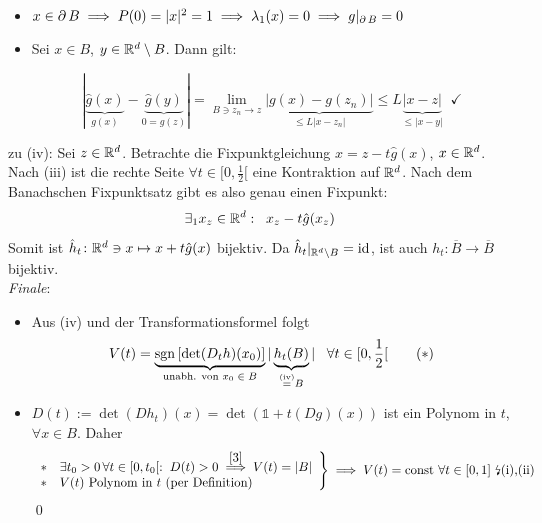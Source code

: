 \documentclass[a4paper]{article}
\begin{document}
\begin{Beweis}
\begin{itemize}
\begin{align*}
\end{align*}
\item $x\in \operatorname{\partial} B\implies P(0)=|x|^2=1\implies \lambda_1(x)=0\implies g|_{\operatorname{\partial} B}=0$
\item Sei $x\in B$, $y\in \mathbb R^d\setminus B$. Dann gilt:\\
\begin{minipage}{0.6\linewidth}
\[|\underbrace{\hat{g}(x)}_{g(x)}-\underbrace{\hat{g}(y)}_{0=g(z)}|=\lim_{B\ni z_n\to z}\underbrace{|g(x)-g(z_n)|}_{\le L|x-z_n|}\le L\underbrace{|x-z|}_{\le |x-y|}\;\;\checkmark\]
\end{minipage}
\begin{minipage}{0.39\linewidth}
\centering
{}
\end{minipage}
\end{itemize}
zu (iv): Sei $z\in\mathbb R^d$. Betrachte die Fixpunktgleichung $x=z-t\hat{g}(x)$, $x\in\mathbb R^d$. Nach (iii) ist die rechte Seite $\forall t\in [0,\frac{1}{2}[$ eine Kontraktion auf $\mathbb R^d$. Nach dem Banachschen Fixpunktsatz gibt es also genau einen Fixpunkt: 
\[\exists_1 x_z\in\mathbb R^d:\;\;x_z-t\hat{g}(x_z)\]
Somit ist $\hat{h}_t\colon \mathbb R^d\ni x\mapsto x+t\hat{g}(x)$ bijektiv. Da $\hat{h}_t|_{\mathbb R^d\setminus B}=\operatorname{\mathrm{id}}$, ist auch $h_t\colon \overline B\to\overline B$ bijektiv.\\
\textit{Finale}:
\begin{itemize}
\item Aus (iv) und der Transformationsformel folgt
\[V(t)=\underbrace{\operatorname{\mathrm{sgn}}\left[\det(D_th)(x_0)\right]}_{\text{unabh. von $x_0\in B$}}|\underbrace{h_t(B)}_{\overset{\text{(iv)}}{=}B}|\;\;\;\forall t\in [0,\frac{1}{2}[\tag{$*$}\label{3}\]
\item $D(t):=\det(Dh_t)(x)=\det(\mathds 1+t(Dg)(x))$ ist ein Polynom in $t$, $\forall x\in B$. Daher
\[ \left.\begin{array}{cl}
*&\exists t_0>0\,\forall t\in[0,t_0[:\;D(t)>0\overset{\eqref{3}}{\implies}V(t)=|B|\\
*& V(t)\text{ Polynom in }t\text{ (per Definition)}
\end{array} \right\}\implies V(t)=\text{const }\forall t\in[0,1]\text{ \lightning (i),(ii)}\]\qed
\end{itemize}
\end{Beweis}
\end{document}
